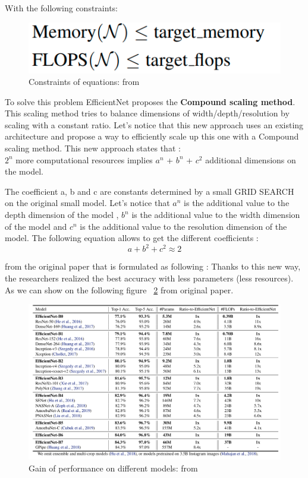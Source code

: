 \documentclass[a4paper]{article}
\begin{document}
With the following constraints: 

       \begin{figure}[H]
        \includegraphics[scale=0.25]{images/condition.png}
            \caption{Constraints of equations: from \cite{DBLP:journals/corr/abs-1905-11946}}
        \label{fig:scaling_multi}
        \end{figure}
     
        
To solve this problem EfficientNet proposes the \textbf{Compound scaling method}. This scaling method tries to balance dimensions of width/depth/resolution by scaling with a constant ratio.
Let’s notice that this new approach uses an existing architecture and propose a way to efficiently scale up this one with a Compound scaling method.
This new approach states that : 
\\
  
       $2^n$ more computational resources implies $a^n$ + $b^n$ + $c^2$ additional dimensions on the model.


The coefficient a, b and c are constants determined by a small GRID SEARCH on the original small model.
Let's notice that $a^n$ is the additional value to the depth dimension of the model , $b^n$ is the additional value to the width dimension of the model and $c^n$ is the additional value to the  resolution dimension of the model.
The following equation allows to get the different coefficients :
	\begin{equation} 
            a + b^2 + c^2 \approx 2
	\end{equation}

from the original paper that is formulated as following : 
Thanks to this new way, the researchers realized the best accuracy with less parameters (less resources). As we can show on the following figure ~\ref{fig:perf} from original paper.
       
        \begin{figure}[H]
        \includegraphics[width=\linewidth]{images/perf.png}
            \caption{Gain of performance on different models: from \cite{DBLP:journals/corr/abs-1905-11946}}
        \label{fig:perf}
        \end{figure}
        
\end{document}

